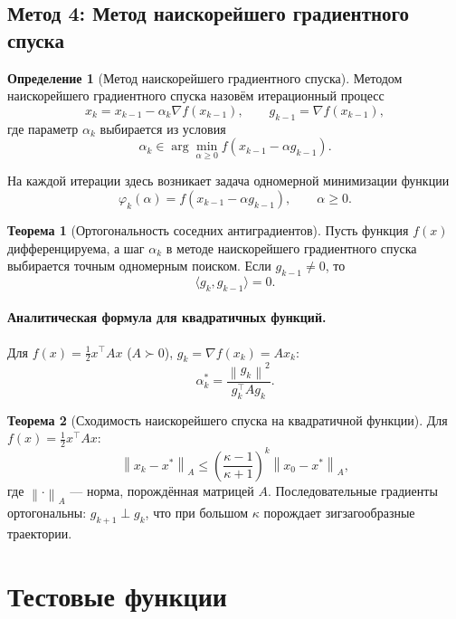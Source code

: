 \documentclass[a4paper,12pt]{article}
\newcommand{\norm}[1]{\left\|#1\right\|}
\newcommand{\grad}{\nabla}
\theoremstyle{definition}
\newtheorem{definition}{Определение}[section]
\newtheorem{theorem}{Теорема}[section]
\begin{document}
\subsection{Метод 4: Метод наискорейшего градиентного спуска}

\begin{definition}[Метод наискорейшего градиентного спуска]
    Методом наискорейшего градиентного спуска назовём итерационный процесс
    \[
        x_k = x_{k-1} - \alpha_k \grad f(x_{k-1}), \qquad g_{k-1} = \grad f(x_{k-1}),
    \]
    где параметр $\alpha_k$ выбирается из условия
    \[
        \alpha_k \in \arg\min_{\alpha \geq 0} f(x_{k-1} - \alpha g_{k-1}).
    \]
\end{definition}

На каждой итерации здесь возникает задача одномерной минимизации функции
\[
    \varphi_k(\alpha) = f(x_{k-1} - \alpha g_{k-1}), \qquad \alpha \geq 0.
\]

\begin{theorem}[Ортогональность соседних антиградиентов]
    Пусть функция $f(x)$ дифференцируема, а шаг $\alpha_k$ в методе наискорейшего 
    градиентного спуска выбирается точным одномерным поиском. Если $g_{k-1} \neq 0$, то
    \[
        \langle g_k, g_{k-1} \rangle = 0.
    \]
\end{theorem}

\paragraph{Аналитическая формула для квадратичных функций.}
Для $f(x) = \tfrac{1}{2} x^\top A x$ ($A \succ 0$), $g_k = \grad f(x_k) = A x_k$:
\begin{equation}
    \label{eq:optimal_alpha_quad}
    \boxed{\alpha_k^* = \frac{\norm{g_k}^2}{g_k^\top A g_k}.}
\end{equation}

\begin{theorem}[Сходимость наискорейшего спуска на квадратичной функции]
    Для $f(x) = \tfrac{1}{2} x^\top A x$:
    \[
        \norm{x_k - x^*}_A \leq \left( \frac{\kappa - 1}{\kappa + 1} \right)^k \norm{x_0 - x^*}_A,
    \]
    где $\norm{\cdot}_A$ — норма, порождённая матрицей $A$. Последовательные градиенты ортогональны: 
    $g_{k+1} \perp g_k$, что при большом $\kappa$ порождает зигзагообразные траектории.
\end{theorem}

\section{Тестовые функции}
\end{document}
